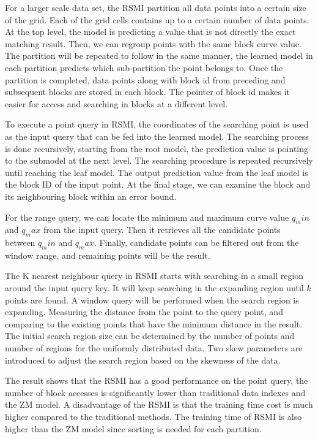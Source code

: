 For a larger scale data set, the RSMI partition all data points into a certain size of the grid. Each of the grid cells contains up to a certain number of data points. At the top level, the model is predicting a value that is not directly the exact matching result. Then, we can regroup points with the same block curve value. The partition will be repeated to follow in the same manner, the learned model in each partition predicts which sub-partition the point belongs to. Once the partition is completed, data points along with block id from preceding and subsequent blocks are stored in each block. The pointer of block id makes it easier for access and searching in blocks at a different level. 

To execute a point query in RSMI, the coordinates of the searching point is used as the input query that can be fed into the learned model. The searching process is done recursively, starting from the root model, the prediction value is pointing to the submodel at the next level. The searching procedure is repeated recursively until reaching the leaf model. The output prediction value from the leaf model is the block ID of the input point. At the final stage, we can examine the block and its neighbouring block within an error bound. 

For the range query, we can locate the minimum and maximum curve value $q_min$ and $q_max$ from the input query. Then it retrieves all the candidate points between $q_min$ and $q_max$. Finally, candidate points can be filtered out from the window range, and remaining points will be the result. 

The K nearest neighbour query in RSMI starts with searching in a small region around the input query key. It will keep searching in the expanding region until $k$ points are found. A window query will be performed when the search region is expanding. Measuring the distance from the point to the query point, and comparing to the existing points that have the minimum distance in the result. The initial search region size can be determined by the number of points and number of regions for the uniformly distributed data. Two skew parameters are introduced to adjust the search region based on the skewness of the data. 

The result shows that the RSMI has a good performance on the point query, the number of block accesses is significantly lower than traditional data indexes and the ZM model. A disadvantage of the RSMI is that the training time cost is much higher compared to the traditional methods. The training time of RSMI is also higher than the ZM model since sorting is needed for each partition.




